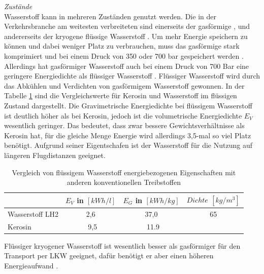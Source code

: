 %
\textit{Zustände}\\
Wasserstoff kann in mehreren Zuständen genutzt werden. Die in der Verkehrsbranche am weitesten verbreiteten
sind einerseits der gasförmige , und andererseits der kryogene flüssige Wasserstoff . 
Um mehr Energie speichern zu können und dabei weniger Platz zu verbrauchen, muss das gasförmige  stark komprimiert und 
bei einem Druck von 350 oder 700 bar gespeichert werden \cite{colpan2022fuel}.
Allerdings hat gasförmiger Wasserstoff auch bei einem Druck von 700 Bar eine geringere Energiedichte
als flüssiger Wasserstoff \cite{eichlseder2012hydrogen}.
Flüssiger Wasserstoff wird durch das Abkühlen und Verdichten von gasförmigem Wasserstoff gewonnen.
In der Tabelle \ref{wasserstoff_energie} sind die Vergleichswerte für Kerosin und Wasserstoff im flüssigen Zustand dargestellt.
Die Gravimetrische Energiedichte bei flüssigem Wasserstoff ist deutlich höher als bei Kerosin, 
jedoch ist die volumetrische Energiedichte $E_V$ wesentlich geringer.
Das bedeutet, dass  zwar bessere Gewichtsverhältnisse als Kerosin hat, 
für die gleiche Menge Energie wird allerdings 3,5-mal so viel Platz benötigt.
Aufgrund seiner Eigentschafen ist der Wasserstoff für die Nutzung auf längeren Flugdistanzen geeignet.
\begin{table}[h]
	\begin{center}
    \caption{Vergleich von flüssigem Wasserstoff energiebezogenen Eigenschaften mit anderen konventionellen Treibstoffen}
	\label{wasserstoff_energie}
	\begin{tabular}{|l|c|c|c|}
		\hline
		& \textbf{$E_V$ in $[kWh/l]$} & \textbf{$E_G$ in $[kWh/kg]$} & \textbf{$Dichte$ $[kg/m^3]$}  \\ \hline
		Wasserstoff LH2 \cite{colpan2022fuel} & 2,6 & 37,0 & 65 \\ \hline
		Kerosin \cite{colpan2022fuel} & ~9,5 & ~11.9 &  \\ \hline %
	\end{tabular}
    \end{center}
\end{table}
%
Flüssiger kryogener Wasserstoff ist wesentlich besser als gasförmiger für den Transport per LKW geeignet,
dafür benötigt er aber einen höheren Energieaufwand \cite{colpan2022fuel}. 

